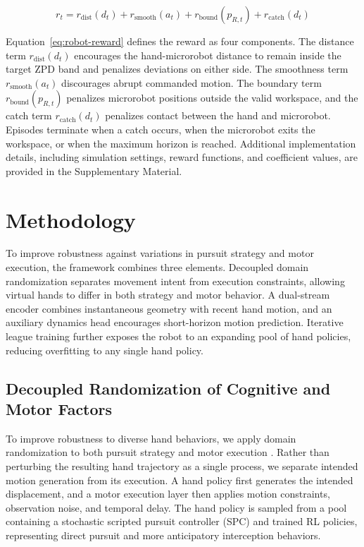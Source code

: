 \documentclass[journal,twoside,web]{ieeecolor2}
\begin{document}
\begin{equation}
r_t = r_{\mathrm{dist}}(d_t)
+ r_{\mathrm{smooth}}(a_t)
+ r_{\mathrm{bound}}(p_{R,t})
+ r_{\mathrm{catch}}(d_t)
\label{eq:robot-reward}
\end{equation}

Equation~\eqref{eq:robot-reward} defines the reward as four components. The distance term $r_{\mathrm{dist}}(d_t)$ encourages the hand-microrobot distance to remain inside the target ZPD band and penalizes deviations on either side. The smoothness term $r_{\mathrm{smooth}}(a_t)$ discourages abrupt commanded motion. The boundary term $r_{\mathrm{bound}}(p_{R,t})$ penalizes microrobot positions outside the valid workspace, and the catch term $r_{\mathrm{catch}}(d_t)$ penalizes contact between the hand and microrobot. Episodes terminate when a catch occurs, when the microrobot exits the workspace, or when the maximum horizon is reached. Additional implementation details, including simulation settings, reward functions, and coefficient values, are provided in the Supplementary Material.

\section{Methodology}
\label{sec:methodology}
To improve robustness against variations in pursuit strategy and motor execution, the framework combines three elements. Decoupled domain randomization separates movement intent from execution constraints, allowing virtual hands to differ in both strategy and motor behavior. A dual-stream encoder combines instantaneous geometry with recent hand motion, and an auxiliary dynamics head encourages short-horizon motion prediction. Iterative league training further exposes the robot to an expanding pool of hand policies, reducing overfitting to any single hand policy.

\subsection{Decoupled Randomization of Cognitive and Motor Factors}
\label{subsec:domain-randomization}
To improve robustness to diverse hand behaviors, we apply domain randomization to both pursuit strategy and motor execution \cite{tobinDomainRandomization2017,pengDynamicsRandomization2018,muratoreRandomizedSimulations2022,chebotarClosingSimReal2019,tiboniDROPO2023}. Rather than perturbing the resulting hand trajectory as a single process, we separate intended motion generation from its execution. A hand policy first generates the intended displacement, and a motor execution layer then applies motion constraints, observation noise, and temporal delay. The hand policy is sampled from a pool containing a stochastic scripted pursuit controller (SPC) and trained RL policies, representing direct pursuit and more anticipatory interception behaviors.
\end{document}
